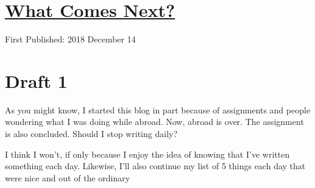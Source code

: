 \documentclass[12pt]{article}[titlepage]
\newcommand{\1}{\={a}}
\newcommand{\2}{\={e}}
\newcommand{\3}{\={\i}}
\newcommand{\4}{\=o}
\newcommand{\5}{\=u}
\newcommand{\6}{\={A}}
\renewcommand{\,}{\textsuperscript{,}}
\begin{document}
\doublespacing
\section{\href{what-comes-next.html}{What Comes Next?}}
First Published: 2018 December 14
\section{Draft 1}
As you might know, I started this blog in part because of assignments and people wondering what I was doing while abroad.
Now, abroad is over.
The assignment is also concluded.
Should I stop writing daily?

I think I won't, if only because I enjoy the idea of knowing that I've written something each day.
Likewise, I'll also continue my list of 5 things each day that were nice and out of the ordinary
\end{document}
